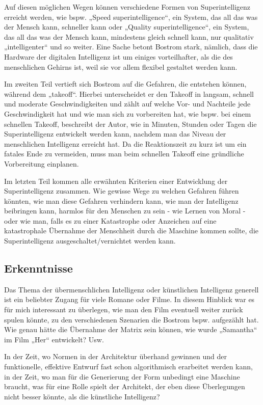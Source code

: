 \documentclass[twoside, a4paper, DIV=11, open=any, bibliography=totoc]{scrbook}
\begin{document}
Auf diesen möglichen Wegen können verschiedene Formen von Superintelligenz erreicht werden, wie bspw. „Speed superintelligence“, ein System, das all das was der Mensch kann, schneller kann oder „Quality superintelligence“, ein System, das all das was der Mensch kann, mindestens gleich schnell kann, nur qualitativ „intelligenter“ und so weiter. Eine Sache betont Bostrom stark, nämlich, dass die Hardware der digitalen Intelligenz ist um einiges vorteilhafter, als die des menschlichen Gehirns ist, weil sie vor allem flexibel gestaltet werden kann. 

Im zweiten Teil vertieft sich Bostrom auf die Gefahren, die entstehen können, während dem „takeoff“. Hierbei unterscheidet er den Takeoff in langsam, schnell und moderate Geschwindigkeiten und zählt auf welche Vor- und Nachteile jede Geschwindigkeit hat und wie man sich zu vorbereiten hat, wie bspw. bei einem schnellen Takeoff, beschreibt der Autor, wie in Minuten, Stunden oder Tagen die Superintelligenz entwickelt werden kann, nachdem man das Niveau der menschlichen Intelligenz erreicht hat. Da die Reaktionszeit zu kurz ist um ein fatales Ende zu vermeiden, muss man beim schnellen Takeoff eine gründliche Vorbereitung einplanen. 

Im letzten Teil kommen alle erwähnten Kriterien einer Entwicklung der Superintelligenz zusammen. Wie gewisse Wege zu welchen Gefahren führen könnten, wie man diese Gefahren verhindern kann, wie man der Intelligenz beibringen kann, harmlos für den Menschen zu sein - wie Lernen von Moral - oder wie man, falls es zu einer Katastrophe oder Anzeichen auf eine katastrophale Übernahme der Menschheit durch die Maschine kommen sollte, die Superintelligenz ausgeschaltet/vernichtet werden kann.

\subsection{Erkenntnisse} \label{sec:literkenntnis1}

Das Thema der übermenschlichen Intelligenz oder künstlichen Intelligenz generell ist ein beliebter Zugang für viele Romane oder Filme. In diesem Hinblick war es für mich interessant zu überlegen, wie man den Film eventuell weiter zurück spulen könnte, zu den verschiedenen Szenarien die Bostrom bspw. aufgezählt hat. Wie genau hätte die Übernahme der Matrix sein können, wie wurde „Samantha“ im Film „Her“ entwickelt? Usw. 

In der Zeit, wo Normen in der Architektur überhand gewinnen und der funktionelle, effektive Entwurf fast schon algorithmisch erarbeitet werden kann, in der Zeit, wo man für die Generierung der Form unbedingt eine Maschine braucht, was für eine Rolle spielt der Architekt, der eben diese Überlegungen nicht besser könnte, als die künstliche Intelligenz? 
\end{document}
